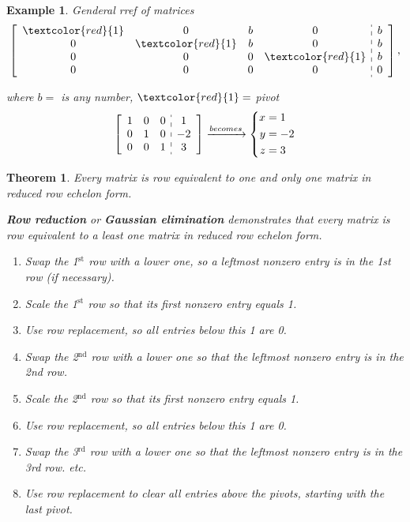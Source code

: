 \documentclass[12pt, a4paper]{article}
\newtheorem{thm}{Theorem}[subsection]
\newtheorem{eg}{Example}[subsection]
\begin{document}
\begin{eg}
Genderal \emph{rref} of matrices
$$\left[\begin{array}{c:c}\begin{matrix}\textcolor{red}{1}&0&b&0\\0&\textcolor{red}{1}&b&0\\0&0&0&\textcolor{red}{1}\\0&0&0&0\end{matrix}&\begin{matrix}b\\b\\b\\0\end{matrix}\end{array}\right], $$

where $b=$ is any number, $\textcolor{red}{1}=$ pivot
$$\left[\begin{array}{c:c}\begin{matrix}1&0&0\\0&1&0\\0&0&1\end{matrix}&\begin{matrix}1\\-2\\3\end{matrix}\end{array}\right]\xrightarrow[]{becomes} \left\{\begin{aligned}x&=1\\y&=-2\\z&=3\end{aligned}\right.$$
\end{eg}

\begin{thm}
Every matrix is row equivalent to one and only one matrix in reduced row echelon form.

\textbf{\textit{Row reduction}} or \textbf{\textit{Gaussian elimination}} demonstrates that every matrix is row equivalent to a least one matrix in reduced row echelon form. 
\begin{enumerate}
\item Swap the 1$^\text{st}$ row with a lower one, so a leftmost nonzero entry is in the 1st row (if necessary).
\item Scale the 1$^\text{st}$ row so that its first nonzero entry equals 1.
\item Use row replacement, so all entries below this 1 are 0.
\item Swap the 2$^\text{nd}$ row with a lower one so that the leftmost nonzero entry is in the 2nd row.
\item Scale the 2$^\text{nd}$ row so that its first nonzero entry equals 1.
\item Use row replacement, so all entries below this 1 are 0.
\item Swap the 3$^\text{rd}$ row with a lower one so that the leftmost nonzero entry is in the 3rd row.
etc.
\item Use row replacement to clear all entries above the pivots, starting with the last pivot.
\end{enumerate}
\end{thm}
\end{document}
